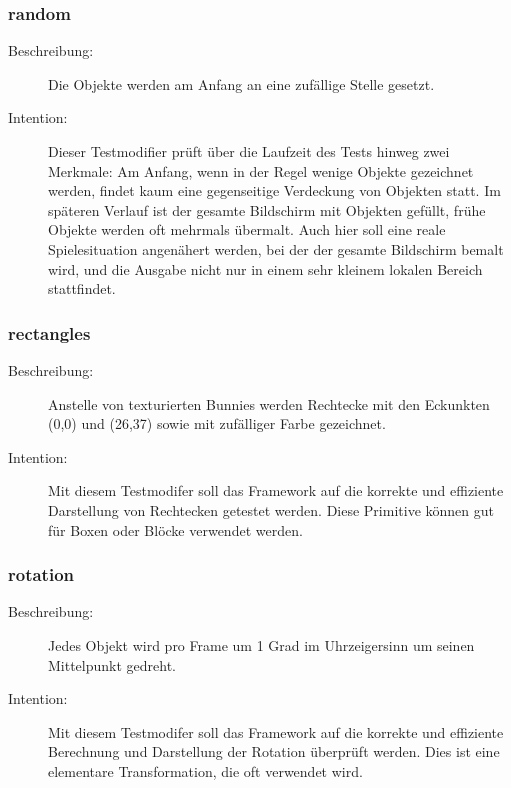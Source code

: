 \subsubsection{random} 
\begin{description}
\item[Beschreibung:] Die Objekte werden am Anfang an eine zufällige Stelle gesetzt. \\
\item[Intention:] Dieser Testmodifier prüft über die Laufzeit des Tests hinweg zwei Merkmale: Am Anfang, wenn in der Regel wenige Objekte gezeichnet werden, findet kaum eine gegenseitige Verdeckung von Objekten statt. Im späteren Verlauf ist der gesamte Bildschirm mit Objekten gefüllt, frühe Objekte werden oft mehrmals übermalt. Auch hier soll eine reale Spielesituation angenähert werden, bei der der gesamte Bildschirm bemalt wird, und die Ausgabe nicht nur in einem sehr kleinem lokalen Bereich stattfindet.
\end{description}

\subsubsection{rectangles}
\begin{description}
\item[Beschreibung:] Anstelle von texturierten Bunnies werden Rechtecke mit den Eckunkten (0,0) und (26,37) sowie mit zufälliger Farbe gezeichnet. \\
\item[Intention:] Mit diesem Testmodifer soll das Framework auf die korrekte und effiziente Darstellung von Rechtecken getestet werden. Diese Primitive können gut für Boxen oder Blöcke verwendet werden.
\end{description}

\subsubsection{rotation}
\begin{description}
\item[Beschreibung:] Jedes Objekt wird pro Frame um 1 Grad im Uhrzeigersinn um seinen Mittelpunkt gedreht. \\
\item[Intention:] Mit diesem Testmodifer soll das Framework auf die korrekte und effiziente Berechnung und Darstellung der Rotation überprüft werden. Dies ist eine elementare Transformation, die oft verwendet wird.
\end{description}

